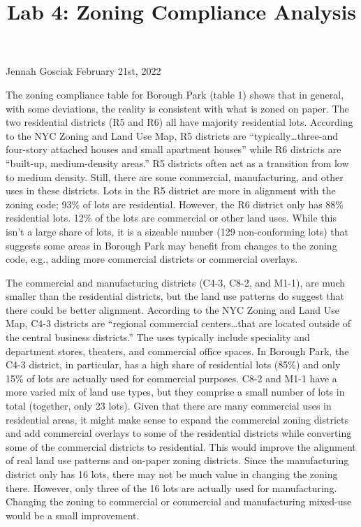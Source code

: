 \documentclass[
  11pt,
  landscape]{article}
\title{Lab 4: Zoning Compliance Analysis}
\author{}
\date{\vspace{-2.5em}}
\begin{document}
\maketitle

\vspace{-2.2cm}
\raggedright

Jennah Gosciak \newline February 21st, 2022 \newline

\onehalfspacing

The zoning compliance table for Borough Park (table 1) shows that in
general, with some deviations, the reality is consistent with what is
zoned on paper. The two residential districts (R5 and R6) all have
majority residential lots. According to the NYC Zoning and Land Use Map,
R5 districts are ``typically\ldots three-and four-story attached houses
and small apartment houses'' while R6 districts are ``built-up,
medium-density areas.'' R5 districts often act as a transition from low
to medium density. Still, there are some commercial, manufacturing, and
other uses in these districts. Lots in the R5 district are more in
alignment with the zoning code; 93\% of lots are residential. However,
the R6 district only has 88\% residential lots. 12\% of the lots are
commercial or other land uses. While this isn't a large share of lots,
it is a sizeable number (129 non-conforming lots) that suggests some
areas in Borough Park may benefit from changes to the zoning code, e.g.,
adding more commercial districts or commercial overlays.

The commercial and manufacturing districts (C4-3, C8-2, and M1-1), are
much smaller than the residential districts, but the land use patterns
do suggest that there could be better alignment. According to the NYC
Zoning and Land Use Map, C4-3 districts are ``regional commercial
centers\ldots that are located outside of the central business
districts.'' The uses typically include speciality and department
stores, theaters, and commercial office spaces. In Borough Park, the
C4-3 district, in particular, has a high share of residential lots
(85\%) and only 15\% of lots are actually used for commercial purposes.
C8-2 and M1-1 have a more varied mix of land use types, but they
comprise a small number of lots in total (together, only 23 lots). Given
that there are many commercial uses in residential areas, it might make
sense to expand the commercial zoning districts and add commercial
overlays to some of the residential districts while converting some of
the commercial districts to residential. This would improve the
alignment of real land use patterns and on-paper zoning districts. Since
the manufacturing district only has 16 lots, there may not be much value
in changing the zoning there. However, only three of the 16 lots are
actually used for manufacturing. Changing the zoning to commercial or
commercial and manufacturing mixed-use would be a small improvement.
\end{document}
